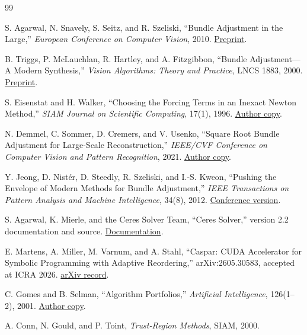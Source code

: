 \documentclass[10pt]{article}
\begin{document}
\begin{thebibliography}{99}
\small

S. Agarwal, N. Snavely, S. Seitz, and R. Szeliski,
``Bundle Adjustment in the Large,''
\emph{European Conference on Computer Vision}, 2010.
\href{https://grail.cs.washington.edu/projects/bal/bal.pdf}{Preprint}.

B. Triggs, P. McLauchlan, R. Hartley, and A. Fitzgibbon,
``Bundle Adjustment---A Modern Synthesis,''
\emph{Vision Algorithms: Theory and Practice}, LNCS 1883, 2000.
\href{https://www.cs.jhu.edu/~misha/ReadingSeminar/Papers/Triggs00.pdf}{Preprint}.

S. Eisenstat and H. Walker,
``Choosing the Forcing Terms in an Inexact Newton Method,''
\emph{SIAM Journal on Scientific Computing}, 17(1), 1996.
\href{https://users.wpi.edu/~walker/Papers/forcing_terms,SISC_17,1996,16-32.pdf}{Author copy}.

N. Demmel, C. Sommer, D. Cremers, and V. Usenko,
``Square Root Bundle Adjustment for Large-Scale Reconstruction,''
\emph{IEEE/CVF Conference on Computer Vision and Pattern Recognition}, 2021.
\href{https://www.usenko.net/pdf/demmel2021rootba.pdf}{Author copy}.

Y. Jeong, D. Nist\'er, D. Steedly, R. Szeliski, and I.-S. Kweon,
``Pushing the Envelope of Modern Methods for Bundle Adjustment,''
\emph{IEEE Transactions on Pattern Analysis and Machine Intelligence}, 34(8), 2012.
\href{https://szeliski.org/papers/Jeong_BundleAdjustment_CVPR10.pdf}{Conference version}.

S. Agarwal, K. Mierle, and the Ceres Solver Team,
``Ceres Solver,'' version 2.2 documentation and source.
\href{https://ceres-solver.readthedocs.io/latest/nnls_solving.html}{Documentation}.

E. Martens, A. Miller, M. Varnum, and A. Stahl,
``Caspar: CUDA Accelerator for Symbolic Programming with Adaptive Reordering,''
arXiv:2605.30583, accepted at ICRA 2026.
\href{https://arxiv.org/abs/2605.30583}{arXiv record}.

C. Gomes and B. Selman,
``Algorithm Portfolios,''
\emph{Artificial Intelligence}, 126(1--2), 2001.
\href{https://www.cs.cornell.edu/selman/papers/pdf/01.aij.portfolios.pdf}{Author copy}.

A. Conn, N. Gould, and P. Toint,
\emph{Trust-Region Methods}, SIAM, 2000.

\end{thebibliography}
\end{document}
